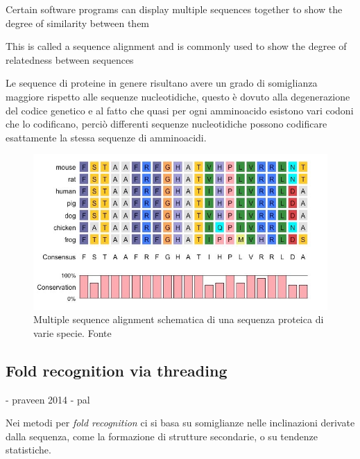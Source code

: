 Certain software programs can display multiple sequences together to show the degree of similarity between them

This is called a sequence alignment and is commonly used to show the degree of relatedness between sequences

Le sequence di proteine in genere risultano avere un grado di somiglianza maggiore rispetto alle sequenze nucleotidiche, questo è dovuto alla degenerazione del codice genetico e al fatto che quasi per ogni amminoacido esistono vari codoni che lo codificano, perciò differenti sequenze nucleotidiche possono codificare esattamente la stessa sequenze di amminoacidi.

\begin{figure}[!htb]
	\centering
	\includegraphics[scale=0.5]{images/msa.jpeg}
	\caption{Multiple sequence alignment schematica di una sequenza proteica di varie specie. Fonte\cite{msaBioNinja}}
	\label{fig:msa}
\end{figure}

\subsection{Fold recognition via threading}
- praveen 2014
- pal 

Nei metodi per \textit{fold recognition} ci si basa su somiglianze nelle inclinazioni derivate dalla sequenza, come la formazione di strutture secondarie, o su tendenze statistiche.


